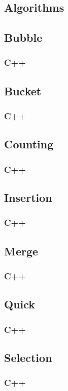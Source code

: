 \documentclass{article}
\begin{document}
\newpage
\begin{appendices}
\section{Algorithms}
\subsection{Bubble}
\label{code:bubble}
\subsubsection{C++}

\newpage
\subsection{Bucket}
\label{code:bucket}
\subsubsection{C++}

\newpage
\subsection{Counting}
\label{code:counting}
\subsubsection{C++}

\newpage
\subsection{Insertion}
\label{code:insertion}
\subsubsection{C++}

\newpage
\subsection{Merge}
\label{code:merge}
\subsubsection{C++}

\newpage
\subsection{Quick}
\label{code:quick}
\subsubsection{C++}

\newpage
\subsection{Selection}
\label{code:selection}
\subsubsection{C++}

\end{appendices}
\end{document}

